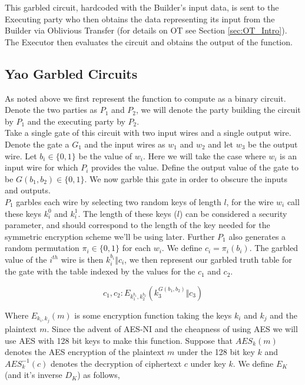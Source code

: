 \documentclass[ %
                    author={Nicholas Tutte},
                supervisor={Prof. Nigel Smart},
                    degree={MEng},
                     title={Secure Two Party Computation},
                  subtitle={A practical comparison of recent protocols},
                      type={Research - GG1K},
                      year={2015} ]{dissertation}
\begin{document}
			This garbled circuit, hardcoded with the Builder's input data, is sent to the Executing party who then obtains the data representing its input from the Builder via Oblivious Transfer (for details on OT see Section  \ref{sec:OT_Intro}). The Executor then evaluates the circuit and obtains the output of the function.


		\subsection{Yao Garbled Circuits} \label{sub:Yao_Details}
			As noted above we first represent the function to compute as a binary circuit. Denote the two parties as $P_1$ and $P_2$, we will denote the party building the circuit by $P_1$ and the executing party by $P_2$.\\
			
			Take a single gate of this circuit with two input wires and a single output wire. Denote the gate a $G_1$ and the input wires as $w_1$ and $w_2$ and let $w_3$ be the output wire. Let $b_i \in \{0, 1\}$ be the value of $w_i$. Here we will take the case where $w_i$ is an input wire for which $P_i$ provides the value. Define the output value of the gate to be $G(b_1, b_2) \in \{0, 1\}$. We now garble this gate in order to obscure the inputs and outputs.\\

			$P_1$ garbles each wire by selecting two random keys of length $l$, for the wire $w_i$ call these keys $k_i^0$ and $k_i^1$. The length of these keys ($l$) can be considered a security parameter, and should correspond to the length of the key needed for the symmetric encryption scheme we'll be using later. Further $P_1$ also generates a random permutation $\pi_i \in \{0, 1\}$ for each $w_i$. We define $c_i = \pi_i(b_i)$. The garbled value of the $i^{th}$ wire is then $k_i^{b_i} \Vert c_i$, we then represent our garbled truth table for the gate with the table indexed by the values for the $c_1$ and $c_2$.

			$$ c_1, c_2 : E_{k_1^{b_1}, k_2^{b_2}} (k_3^{ G(b_1, b_2) } \Vert c_3) $$

			Where $E_{k_i, k_j}(m)$ is some encryption function taking the keys $k_i$ and $k_j$ and the plaintext $m$. Since the advent of AES-NI and the cheapness of using AES we will use AES with 128 bit keys to make this function. Suppose that $AES_k(m)$ denotes the AES encryption of the plaintext $m$ under the 128 bit key $k$ and $AES^{-1}_k(c)$ denotes the decryption of ciphertext $c$ under key $k$. We define $E_K$ (and it's inverse $D_K$) as follows,
\end{document}
